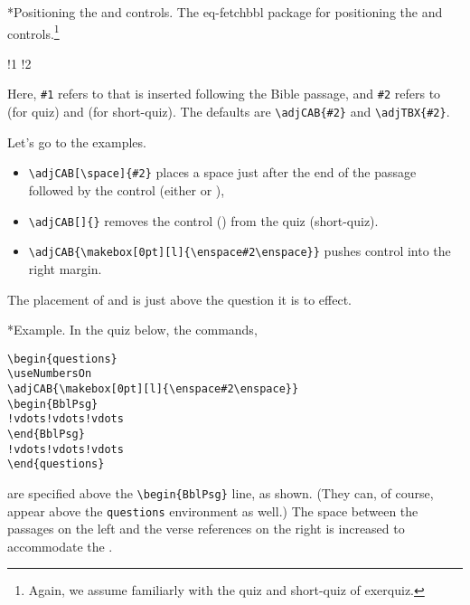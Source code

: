 \documentclass{article}
\makeatletter
\edef\amtIndent{\the\parindent}
\let\pkg\textsf
\let\env\texttt
\renewcommand*{\theparagraph}{\texorpdfstring{\protect\P\protect\ }{\textparagraph}}
\renewcommand{\paragraph}
    {\renewcommand{\@seccntformat}[1]{\theparagraph}%
    \@startsection{paragraph}{4}{0pt}{6pt}{-3pt}{\color{\aeb@subsubsectioncolor}\bfseries}}
\makeatother
\begin{document}
\paragraph*{Positioning the  and  controls.} The \pkg{eq-fetchbbl} package
for positioning the  and  controls.\footnote{Again, we assume familiarly with
the quiz and short-quiz of \pkg{exerquiz}.}
\bVerb{}%
\def\1{\rlap{\hskip\linewidth\textsf{(positions \cs{CorrAnsButton})}}}%
\def\2{\rlap{\hskip\linewidth\textsf{(positions \cs{sqTallyBox})}}}%
\begin{dCmd}[commandchars=!()]{\bxSize}
!1
!2
\end{dCmd}
\eVerb Here, \texttt{\#1} refers to  that is inserted following the
Bible passage, and \texttt{\#2} refers to  (for quiz) and
 (for short-quiz). The defaults are \verb~\adjCAB{#2}~ and
\verb~\adjTBX{#2}~.

\newtopic\noindent
Let's go to the examples.
\begin{itemize}
      \item \verb!\adjCAB[\space]{#2}! places a space just after the end of the passage followed
        by the control (either  or ),
      \item \verb!\adjCAB[]{}! removes the control 
          () from the quiz (short-quiz).
      \item \verb!\adjCAB{\makebox[0pt][l]{\enspace#2\enspace}}! pushes control
      into the right margin.
\end{itemize}
The placement of  and  is just above the question it is
to effect.

\paragraph*{Example.}
In the quiz below, the commands,
\begin{Verbatim}[xleftmargin=\amtIndent,commandchars=!()]
\begin{questions}
\useNumbersOn
\adjCAB{\makebox[0pt][l]{\enspace#2\enspace}}
\begin{BblPsg}
!vdots!vdots!vdots
\end{BblPsg}
!vdots!vdots!vdots
\end{questions}
\end{Verbatim}
are specified above the \verb~\begin{BblPsg}~ line, as shown. (They can, of
course, appear above the \env{questions} environment as well.) The space
between the passages on the left and the verse references on the right is
increased to accommodate the .
\end{document}
